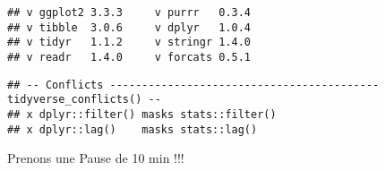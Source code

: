 \documentclass[
]{article}
\begin{document}
\begin{verbatim}
## v ggplot2 3.3.3     v purrr   0.3.4
## v tibble  3.0.6     v dplyr   1.0.4
## v tidyr   1.1.2     v stringr 1.4.0
## v readr   1.4.0     v forcats 0.5.1
\end{verbatim}

\begin{verbatim}
## -- Conflicts ------------------------------------------ tidyverse_conflicts() --
## x dplyr::filter() masks stats::filter()
## x dplyr::lag()    masks stats::lag()
\end{verbatim}

Prenons une Pause de 10 min !!!
\end{document}
